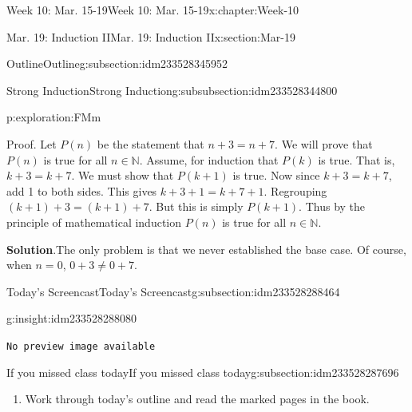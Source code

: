 \documentclass[oneside,10pt,]{book}
\newcommand{\blocktitlefont}{\relax}
\newcommand{\mono}[1]{\texttt{#1}}
\numberwithin{equation}{section}
\newlength{\qrsize}
\newlength{\previewwidth}
\def\N{{\mathbb N}}
\newcommand{\N}{\mathbb N}
\begin{document}
\begin{chapterptx}{Week 10: Mar. 15-19}{}{Week 10: Mar. 15-19}{}{}{x:chapter:Week-10}
\begin{sectionptx}{Mar. 19: Induction II}{}{Mar. 19: Induction II}{}{}{x:section:Mar-19}
\begin{subsectionptx}{Outline}{}{Outline}{}{}{g:subsection:idm233528345952}
\begin{subsubsectionptx}{Strong Induction}{}{Strong Induction}{}{}{g:subsubsection:idm233528344800}
\begin{exploration}{}{p:exploration:FMm}
\par
Proof. Let \(P(n)\) be the statement that \(n + 3 = n + 7\). We will prove that \(P(n)\) is true for all \(n \in \N\). Assume, for induction that \(P(k)\) is true. That is, \(k+3 = k+7\). We must show that \(P(k+1)\) is true. Now since \(k + 3 = k + 7\), add 1 to both sides. This gives \(k + 3 + 1 = k + 7 + 1\). Regrouping \((k+1) + 3 = (k+1) + 7\). But this is simply \(P(k+1)\). Thus by the principle of mathematical induction \(P(n)\) is true for all \(n \in \N\).%
\par\smallskip%
\noindent\textbf{\blocktitlefont Solution}.\hypertarget{p:solution:OaF}{}\quad{}The only problem is that we never established the base case. Of course, when \(n = 0\), \(0+3 \ne 0+7\).%
\end{exploration}%
\end{subsubsectionptx}
\end{subsectionptx}
%
%
\typeout{************************************************}
\typeout{************************************************}
%
\begin{subsectionptx}{Today's Screencast}{}{Today's Screencast}{}{}{g:subsection:idm233528288464}
\begin{insight}{}{g:insight:idm233528288080}%
\setlength{\qrsize}{9em}
\setlength{\previewwidth}{\linewidth}
\addtolength{\previewwidth}{-\qrsize}
\begin{tcbraster}[raster columns=2, raster column skip=1pt, raster halign=center, raster force size=false, raster left skip=0pt, raster right skip=0pt]%
\begin{tcolorbox}[previewstyle, width=\previewwidth]%
\mono{No preview image available}%
\end{tcolorbox}%
\begin{tcolorbox}[qrstyle]%
[QR LINK]\end{tcolorbox}%
\end{tcbraster}%
\end{insight}
\end{subsectionptx}
%
%
\typeout{************************************************}
\typeout{************************************************}
%
\begin{subsectionptx}{If you missed class today}{}{If you missed class today}{}{}{g:subsection:idm233528287696}
%
\begin{enumerate}
\item{}Work through today's outline and read the marked pages in the book.%

\end{enumerate}
\end{subsectionptx}
\end{sectionptx}
\end{chapterptx}
\end{document}
